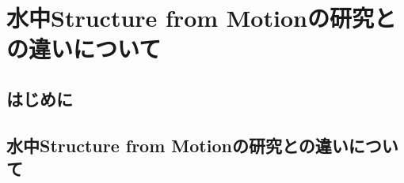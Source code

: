 \chapter{水中Structure from Motionの研究との違いについて}
\setcounter{page}{1}
\renewcommand{\thepage}{B--\arabic{page}}

\thispagestyle{empty}

\newpage
\section{はじめに}


\newpage

\section{水中Structure from Motionの研究との違いについて}


\newpage


